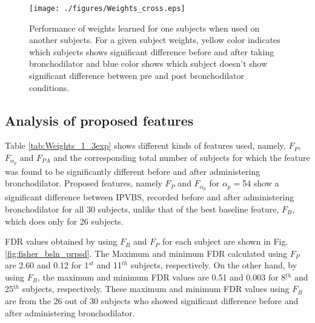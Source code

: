 \documentclass{article}
\begin{document}
	
	\begin{figure}[h!]
	\centering
	 \texttt{[image: ./figures/Weights\_cross.eps]}
	\caption{Performance of weights learned for one subjects when used on another subjects. For a given subject weights, yellow color indicates which subjects shows significant difference before and after taking bronchodilator and blue color shows which subject doesn't show significant difference between pre and post bronchodilator conditions.}
	\label{fig:Weights_cross}
	\end{figure}
	

%	

\subsection{Analysis of proposed features}



Table \ref{tab:Weights_1_3exp} shows different kinds of features used, namely, $F_{P}$, $F_{\alpha_{p}}$ and $F_{PA}$ and the corresponding total number of subjects for which the feature was found to be significantly different before and after administering bronchodilator. Proposed features, namely $F_P$ and $F_{\alpha_{p}}$ for $\alpha_p=$54 show a significant difference between IPVBS, recorded before and after administering bronchodilator for all 30 subjects, unlike that of the best baseline feature, $F_B$, which does only for 26 subjects. 

FDR values obtained by using $F_{B}$ and $F_{P}$ for each subject are shown in Fig. \ref{fig:fisher_bsln_prpsd}. The Maximum and minimum FDR calculated using $F_{P}$ are 2.60 and 0.12  for 1$^{st}$ and 11$^{th}$ subjects, respectively. On the other hand, by using $F_{B}$, the maximum and minimum FDR values are 0.51 and 0.003 for 8$^{th}$ and 25$^{th}$ subjects, respectively. These maximum and minimum FDR values using $F_{B}$ are from the 26 out of 30 subjects who showed significant difference before and after administering bronchodilator. 
\end{document}
